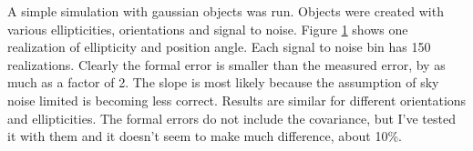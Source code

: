 \documentclass[preprint]{aastex}
\begin{document}
A simple simulation with gaussian objects was run. Objects were created with
various ellipticities, orientations and signal to noise. Figure
\ref{testerror1} shows one realization of ellipticity and position angle. Each
signal to noise bin has 150 realizations. Clearly the formal error is smaller
than the measured error, by as much as a factor of 2.  The slope is most likely
because the assumption of sky noise limited is becoming less correct. Results
are similar for different orientations and ellipticities. The formal errors
do not include the covariance, but I've tested it with them and it doesn't
seem to make much difference, about 10\%.


\begin{figure}
 \label{testerror1}
\end{figure}
\end{document}
